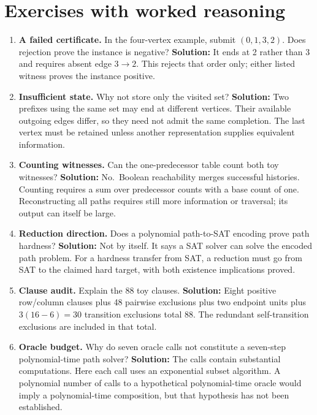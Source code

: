 \section{Exercises with worked
reasoning}\label{exercises-with-worked-reasoning}

\begin{enumerate}
\def\labelenumi{\arabic{enumi}.}
\item
  \textbf{A failed certificate.} In the four-vertex example, submit
  \((0,1,3,2)\). Does rejection prove the instance is negative?
  \textbf{Solution:} It ends at 2 rather than 3 and requires absent edge
  \(3\to2\). This rejects that order only; either listed witness proves
  the instance positive.
\item
  \textbf{Insufficient state.} Why not store only the visited set?
  \textbf{Solution:} Two prefixes using the same set may end at
  different vertices. Their available outgoing edges differ, so they
  need not admit the same completion. The last vertex must be retained
  unless another representation supplies equivalent information.
\item
  \textbf{Counting witnesses.} Can the one-predecessor table count both
  toy witnesses? \textbf{Solution:} No.~Boolean reachability merges
  successful histories. Counting requires a sum over predecessor counts
  with a base count of one. Reconstructing all paths requires still more
  information or traversal; its output can itself be large.
\item
  \textbf{Reduction direction.} Does a polynomial path-to-SAT encoding
  prove path hardness? \textbf{Solution:} Not by itself. It says a SAT
  solver can solve the encoded path problem. For a hardness transfer
  from SAT, a reduction must go from SAT to the claimed hard target,
  with both existence implications proved.
\item
  \textbf{Clause audit.} Explain the 88 toy clauses. \textbf{Solution:}
  Eight positive row/column clauses plus 48 pairwise exclusions plus two
  endpoint units plus \(3(16-6)=30\) transition exclusions total 88. The
  redundant self-transition exclusions are included in that total.
\item
  \textbf{Oracle budget.} Why do seven oracle calls not constitute a
  seven-step polynomial-time path solver? \textbf{Solution:} The calls
  contain substantial computations. Here each call uses an exponential
  subset algorithm. A polynomial number of calls to a hypothetical
  polynomial-time oracle would imply a polynomial-time composition, but
  that hypothesis has not been established.

\end{enumerate}
